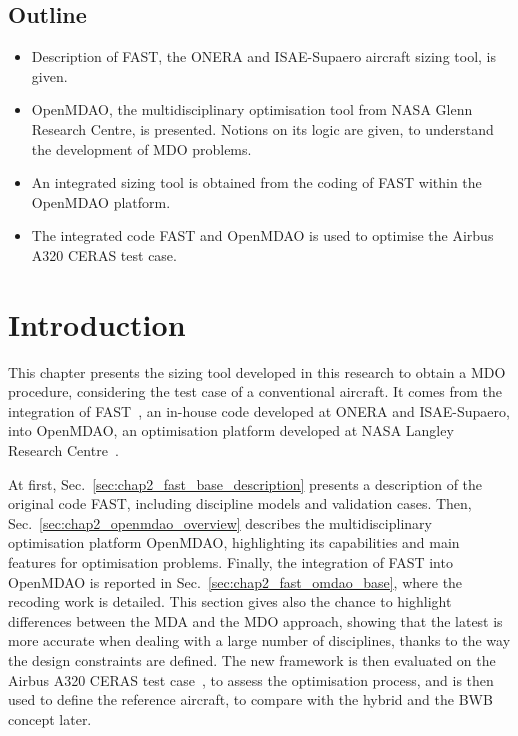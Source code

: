 \begin{mdframed}[hidealllines=true,backgroundcolor=purple!20]
	\section*{Outline}
	
	\begin{itemize}
	
		\item Description of FAST, the ONERA and ISAE-Supaero aircraft sizing tool, is given. 
		
		\item OpenMDAO, the multidisciplinary optimisation tool from NASA Glenn Research Centre, is presented. Notions on its logic are given, to understand the development of MDO problems. 
		
		\item An integrated sizing tool is obtained from the coding of FAST within the OpenMDAO platform. 
		
		\item The integrated code FAST and OpenMDAO is used to optimise the Airbus A320 CERAS test case. 
		
	\end{itemize}

\end{mdframed}

\cleardoublepage

\section{Introduction}
\label{sec:chap2_intro}

This chapter presents the sizing tool developed in this research to obtain a MDO procedure, considering the test case of a conventional aircraft. 
It comes from the integration of FAST~\cite{bib:fast_main}, an in-house code developed at ONERA and ISAE-Supaero, into OpenMDAO, an optimisation platform developed at NASA Langley Research Centre~\cite{bib:openmdao_website, bib:gray_omdao}. 

At first, Sec.~\ref{sec:chap2_fast_base_description} presents a description of the original code FAST, including discipline models and validation cases. 
Then, Sec.~\ref{sec:chap2_openmdao_overview} describes the multidisciplinary optimisation platform OpenMDAO, highlighting its capabilities and main features for optimisation problems.
Finally, the integration of FAST into OpenMDAO is reported in Sec.~\ref{sec:chap2_fast_omdao_base}, where the recoding work is detailed. 
This section gives also the chance to highlight differences between the MDA and the MDO approach, showing that the latest is more accurate when dealing with a large number of disciplines, thanks to the way the design constraints are defined. 
The new framework is then evaluated on the Airbus A320 CERAS test case~\cite{bib:ceras}, to assess the optimisation process, and is then used to define the reference aircraft, to compare with the hybrid and the BWB concept later. 

